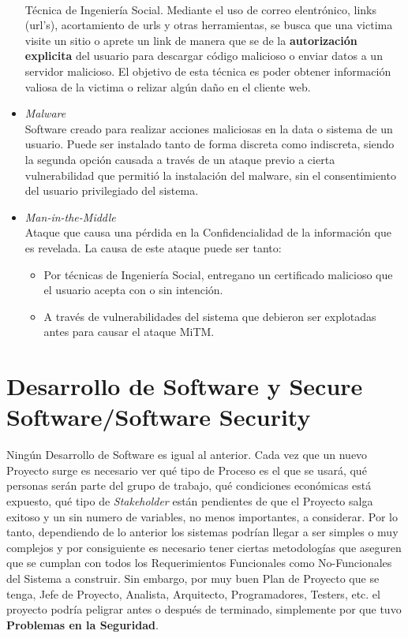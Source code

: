 \begin{itemize}
		\\Técnica de Ingeniería Social. Mediante el uso de correo elentrónico, links (url's), acortamiento de urls y otras herramientas, se busca que una victima visite un sitio o aprete un link de manera que se de la \textbf{autorización explicita} del usuario para descargar código malicioso o enviar datos a un servidor malicioso. El objetivo de esta técnica es poder obtener información valiosa de la victima o relizar algún daño en el cliente web.
	\item \textit{Malware}
		\\Software creado para realizar acciones maliciosas en la data o sistema de un usuario. Puede ser instalado tanto de forma discreta como indiscreta, siendo la segunda opción causada a través de un ataque previo a cierta vulnerabilidad que permitió la instalación del malware, sin el consentimiento del usuario privilegiado del sistema.
	\item \textit{Man-in-the-Middle}
		\\Ataque que causa una pérdida en la Confidencialidad de la información que es revelada. La causa de este ataque puede ser tanto:
			\begin{itemize}
				\item Por técnicas de Ingeniería Social, entregano un certificado malicioso que el usuario acepta con o sin intención.
				\item A través de vulnerabilidades del sistema que debieron ser explotadas antes para causar el ataque MiTM.
			\end{itemize}
\end{itemize}



\section{Desarrollo de Software y Secure Software/Software Security}
\label{chap:SD_SS}

Ningún Desarrollo de Software es igual al anterior. Cada vez que un nuevo Proyecto surge es necesario ver qué tipo de Proceso es el que se usará, qué personas serán parte del grupo de trabajo, qué condiciones económicas está expuesto, qué tipo de \textit{Stakeholder} están pendientes de que el Proyecto salga exitoso y un sin numero de variables, no menos importantes, a considerar. Por lo tanto, dependiendo de lo anterior los sistemas podrían llegar a ser simples o muy complejos y por consiguiente es necesario tener ciertas metodologías que aseguren que se cumplan con todos los Requerimientos Funcionales como No-Funcionales del Sistema a construir. Sin embargo, por muy buen Plan de Proyecto que se tenga, Jefe de Proyecto, Analista, Arquitecto, Programadores, Testers, etc. el proyecto podría peligrar antes o después de terminado, simplemente por que tuvo \textbf{Problemas en la Seguridad}.

